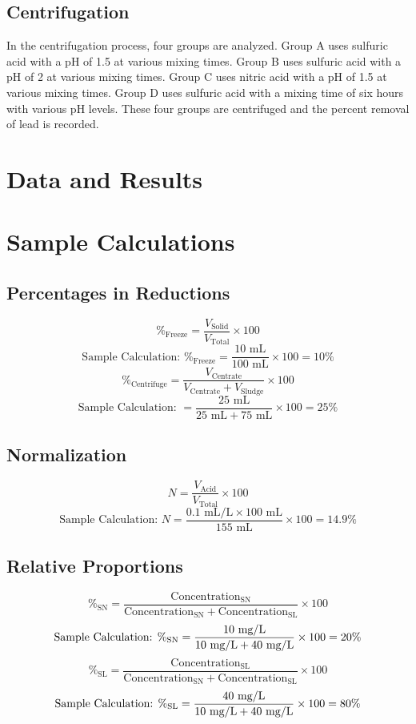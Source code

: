 \documentclass{article}
\begin{document}
    \subsection{Centrifugation}
    In the centrifugation process, four groups are analyzed. Group A uses sulfuric acid with a pH of 1.5 at various mixing times. Group B uses sulfuric acid with a pH of 2 at various mixing times. Group C uses nitric acid with a pH of 1.5 at various mixing times. Group D uses sulfuric acid with a mixing time of six hours with various pH levels. These four groups are centrifuged and the percent removal of lead is recorded.
    \newpage
    \section{Data and Results}
    
    \newpage
    \section{Sample Calculations}
    \subsection{Percentages in Reductions}
    \[\%_{\text{Freeze}}=\frac{V_\text{Solid}}{V_\text{Total}}\times 100\]
    \[\text{Sample Calculation: }\%_{\text{Freeze}}=\frac{10\text{ mL}}{100\text{ mL}}\times 100=10\%\]
    \[\%_{\text{Centrifuge}}=\frac{V_\text{Centrate}}{V_\text{Centrate}+V_\text{Sludge}}\times 100\]
    \[\text{Sample Calculation: }=\frac{25\text{ mL}}{25\text{ mL}+75\text{ mL}}\times 100=25\%\]
    \subsection{Normalization}
    \[N=\frac{V_\text{Acid}}{V_\text{Total}}\times100\]
    \[\text{Sample Calculation: }N=\frac{0.1\text{ mL/L}\times100\text{ mL}}{155\text{ mL}}\times100=14.9\%\]
    \subsection{Relative Proportions}
    \[\%_{\text{SN}}=\frac{\text{Concentration}_\text{SN}}{\text{Concentration}_\text{SN}+\text{Concentration}_\text{SL}}\times 100\]
    \[\text{Sample Calculation: }\%_{\text{SN}}=\frac{\text{10\text{ mg/L}}}{\text{10\text{ mg/L}}+\text{40\text{ mg/L}}}\times 100=20\%\]
    \[\%_{\text{SL}}=\frac{\text{Concentration}_\text{SL}}{\text{Concentration}_\text{SN}+\text{Concentration}_\text{SL}}\times 100\]
    \[\text{Sample Calculation: }\%_{\text{SL}}=\frac{\text{40\text{ mg/L}}}{\text{10\text{ mg/L}}+\text{40\text{ mg/L}}}\times 100=80\%\]
    \newpage
\end{document}

